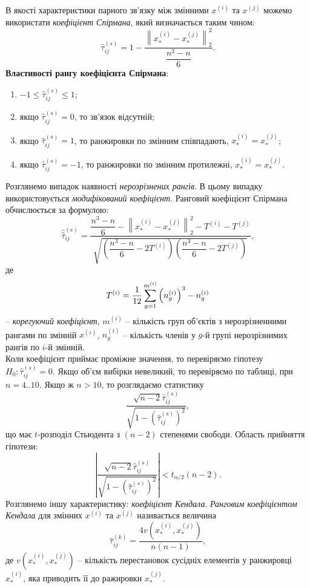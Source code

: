 В якості характеристики парного зв'язку між змінними $x^{(i)}$ та $x^{(j)}$ можемо використати \textit{коефіцієнт Спірмана}, який визначається таким чином: \[ \widehat{\tau}_{ij}^{(s)} = 1 - \dfrac{\left\|x_*^{(i)}-x_*^{(j)}\right\|_2^2}{\dfrac{n^3-n}{6}}. \]
\textbf{Властивості рангу коефіцієнта Спірмана}:
\begin{enumerate}
	\item $-1 \le \widehat{\tau}_{ij}^{(s)} \le 1$;
	\item якщо $\widehat{\tau}_{ij}^{(s)} = 0$, то зв'язок відсутній;
	\item якщо $\widehat{\tau}_{ij}^{(s)} = 1$, то ранжировки по змінним співпадають, $x_*^{(i)} =x_*^{(j)}$;
	\item якщо $\widehat{\tau}_{ij}^{(s)} = -1$, то ранжировки по змінним протилежні, $x_*^{(i)} =x_*^{(j)}$.
\end{enumerate}
Розглянемо випадок наявності \textit{нерозрізнених рангів}. В цьому випадку використовується \textit{модифікований коефіцієнт}. Ранговий коефіцієнт Спірмана обчислюється за формулою:
\[ \widehat{\widehat{\tau}}_{ij}^{(s)} = \dfrac{\dfrac{n^3-n}{6}-\left\|x_*^{(i)}-x_*^{(j)}\right\|_2^2-T^{(i)}-T^{(j)}}{\sqrt{\left(\dfrac{n^3-n}{6}-2T^{(i)}\right)\left(\dfrac{n^3-n}{6}-2T^{(j)}\right)}}, \] де \[ T^{(i)} = \dfrac{1}{12} \displaystyle\sum\limits_{g=1}^{m^{(i)}} \left(n_g^{(i)}\right)^3 - n_g^{(i)} \] -- \textit{корегуючий коефіцієнт}, $m^{(i)}$ -- кількість груп об'єктів з нерозрізненними рангами по змінній $x^{(i)}$, $n_g^{(i)}$ -- кількість членів у $g$-й групі нерозрізнимих рангів по $i$-й змінній. \\

Коли коефіцієнт приймає проміжне значення, то перевіряємо гіпотезу $H_0: \widehat{\tau}_{ij}^{(s)} = 0$. Якщо об'єм вибірки невеликий, то перевіряємо по таблиці, при $n = 4..10$. Якщо ж $n > 10$, то розглядаємо статистику \[\dfrac{\sqrt{n-2}\widehat{\tau}_{ij}^{(s)}}{\sqrt{1-\left(\widehat{\tau}_{ij}^{(s)}\right)^2}},\] що має $t$-розподіл Стьюдента з $(n - 2)$ степенями свободи. Область прийняття гіпотези: \[\left|\dfrac{\sqrt{n-2}\widehat{\tau}_{ij}^{(s)}}{\sqrt{1-\left(\widehat{\tau}_{ij}^{(s)}\right)^2}}\right| < t_{\alpha/2}(n-2). \]
Розглянемо іншу характеристику: \textit{коефіцієнт Кендала}. \textit{Ранговим коефіцієнтом Кендала} для змінних $x^{(i)}$ та $x^{(j)}$ називається величина \[\widehat{\tau}_{ij}^{(k)} = \dfrac{4v\left(x_*^{(i)},x_*^{(j)}\right)}{n(n-1)},\] де $v\left(x_*^{(i)},x_*^{(j)}\right)$ -- кількість перестановок сусідніх елементів у ранжировці $x_*^{(i)}$, яка приводить її до ражировки $x_*^{(j)}$. \\

